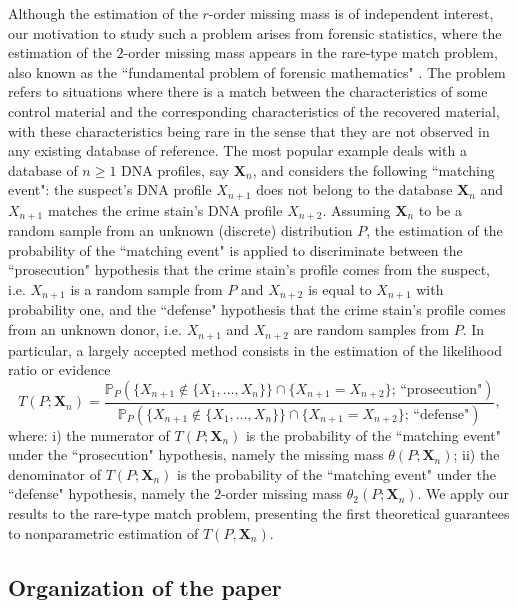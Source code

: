 \documentclass{article}
\newcommand{\1}{\boldsymbol{1}}
\theoremstyle{plain}
\begin{document}
Although the estimation of the $r$-order missing mass is of independent interest, our motivation to study such a problem arises from forensic statistics, where the estimation of the $2$-order missing mass appears in  the rare-type match problem, also known as the ``fundamental problem of forensic mathematics" \cite{Bre(10),Cer(17),Cer(20)}. The problem refers to situations where there is a match between the characteristics of some control material and the corresponding characteristics of the recovered material, with these characteristics being rare in the sense that they are not observed in any existing database of reference. The most popular example deals with a database of $n\geq1$ DNA profiles, say $\mathbf{X}_{n}$, and considers the following ``matching event": the suspect's DNA profile $X_{n+1}$ does not belong to the database $\mathbf{X}_{n}$ and $X_{n+1}$ matches the crime stain's DNA profile $X_{n+2}$. Assuming $\mathbf{X}_{n}$ to be a random sample from an unknown (discrete) distribution $P$, the estimation of the probability of the ``matching event" is applied to discriminate between the ``prosecution" hypothesis that the crime stain's profile comes from the suspect, i.e. $X_{n+1}$ is a random sample from $P$ and $X_{n+2}$ is equal to $X_{n+1}$ with probability one, and the ``defense" hypothesis that the crime stain's profile comes from an unknown donor, i.e. $X_{n+1}$ and $X_{n+2}$ are random samples from $P$. In particular, a largely accepted method consists in the estimation of the likelihood ratio or  evidence
\begin{displaymath}
T(P;\mathbf{X}_{n})=\frac{\mathbb{P}_{P}(\{X_{n+1}\notin\{X_{1},\ldots,X_{n}\}\}\cap\{X_{n+1}=X_{n+2}\};\,\text{``prosecution"})}{\mathbb{P}_{P}(\{X_{n+1}\notin\{X_{1},\ldots,X_{n}\}\}\cap\{X_{n+1}=X_{n+2}\};\,\text{``defense"})},
\end{displaymath}
where: i) the numerator of $T(P;\mathbf{X}_{n})$ is the probability of the ``matching event" under the ``prosecution" hypothesis, namely the missing mass $\theta(P;\mathbf{X}_{n})$; ii) the denominator of $T(P;\mathbf{X}_{n})$ is the probability of the ``matching event" under the ``defense" hypothesis, namely the $2$-order missing mass $\theta_{2}(P;\mathbf{X}_{n})$. We apply our results to the rare-type match problem, presenting the first theoretical guarantees to nonparametric estimation of $T(P,\mathbf{X}_{n})$.

\subsection{Organization of the paper}
\end{document}
